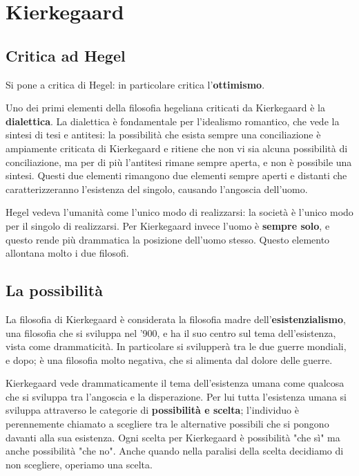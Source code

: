 \documentclass[a4paper, twoside, titlepage]{book}
\begin{document}
\part{Kierkegaard}

\chapter{Critica ad Hegel}

Si pone a critica di Hegel: in particolare critica l'\textbf{ottimismo}.

Uno dei primi elementi della filosofia hegeliana criticati da Kierkegaard è la \textbf{dialettica}. La dialettica è fondamentale per l'idealismo romantico, che vede la sintesi di tesi e antitesi: la possibilità che esista sempre una conciliazione è ampiamente criticata di Kierkegaard e ritiene che non vi sia alcuna possibilità di conciliazione, ma per di più l'antitesi rimane sempre aperta, e non è possibile una sintesi. Questi due elementi rimangono due elementi sempre aperti e distanti che caratterizzeranno l'esistenza del singolo, causando l'angoscia dell'uomo.

Hegel vedeva l'umanità come l'unico modo di realizzarsi: la società è l'unico modo per il singolo di realizzarsi.
Per Kierkegaard invece l'uomo è \textbf{sempre solo}, e questo rende più drammatica la posizione dell'uomo stesso.
Questo elemento allontana molto i due filosofi.

\chapter{La possibilità}

La filosofia di Kierkegaard è considerata la filosofia madre dell'\textbf{esistenzialismo}, una filosofia che si sviluppa nel '900, e ha il suo centro sul tema dell'esistenza, vista come drammaticità. In particolare si svilupperà tra le due guerre mondiali, e dopo; è una filosofia molto negativa, che si alimenta dal dolore delle guerre.

Kierkegaard vede drammaticamente il tema dell'esistenza umana come qualcosa che si sviluppa tra l'angoscia e la disperazione. Per lui tutta l'esistenza umana si sviluppa attraverso le categorie di \textbf{possibilità e scelta}; l'individuo è perennemente chiamato a scegliere tra le alternative possibili che si pongono davanti alla sua esistenza. Ogni scelta per Kierkegaard è possibilità "che sì" ma anche possibilità "che no".
Anche quando nella paralisi della scelta decidiamo di non scegliere, operiamo una scelta.
\end{document}
